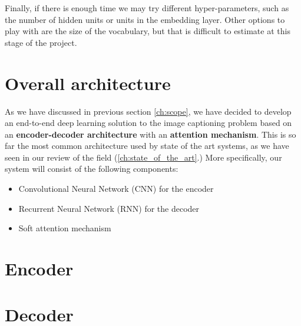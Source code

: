 Finally, if there is enough time we may try different hyper-parameters, such as the number of hidden units or units in the embedding layer. Other options to play with are the size of the vocabulary, but that is difficult to estimate at this stage of the project.


\section{Overall architecture}

As we have discussed in previous section \cref{ch:scope}, we have decided to develop an end-to-end deep learning solution to the image captioning problem based on an \textbf{encoder-decoder architecture} with an \textbf{attention mechanism}. This is so far the most common architecture used by state of the art systems, as we have seen in our review of the field (\cref{ch:state_of_the_art}.)
More specifically, our system will consist of the following components:

\begin{itemize}
    \item Convolutional Neural Network (CNN) for the encoder
    \item Recurrent Neural Network (RNN) for the decoder
    \item Soft attention mechanism
\end{itemize}


\section{Encoder}

\section{Decoder}














